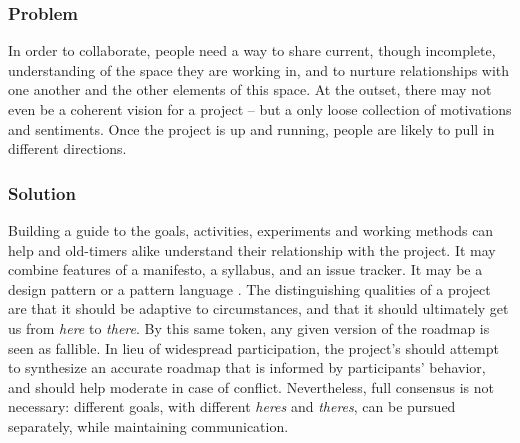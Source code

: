 \subsubsection*{Problem} In order to collaborate, people need a way to share current, though incomplete, understanding of the space they are working in, and to nurture relationships with one another and the other elements of this space.  At the outset, there may not even be a coherent vision for a project -- but a only loose collection of motivations and sentiments.  Once the project is up and running, people are likely to pull in different directions.   

\subsubsection*{Solution}  Building a guide to the goals, activities, experiments and working methods can help  and old-timers alike understand their relationship with the project.
It may combine features of a manifesto, a syllabus, and an issue tracker.  It may be a design pattern or a pattern language \cite{kohls2010structure}.  The distinguishing qualities of a project  are that it should be adaptive to circumstances, and that it should ultimately get us from \emph{here} to \emph{there}.  By this same token, any given version of the roadmap is seen as fallible. 
In lieu of widespread participation, the project's  should attempt to synthesize an accurate roadmap that is informed by participants' behavior, and should help moderate in case of conflict.  Nevertheless, full consensus is not necessary: different goals, with different \emph{heres} and \emph{theres}, can be pursued separately, while maintaining communication.

